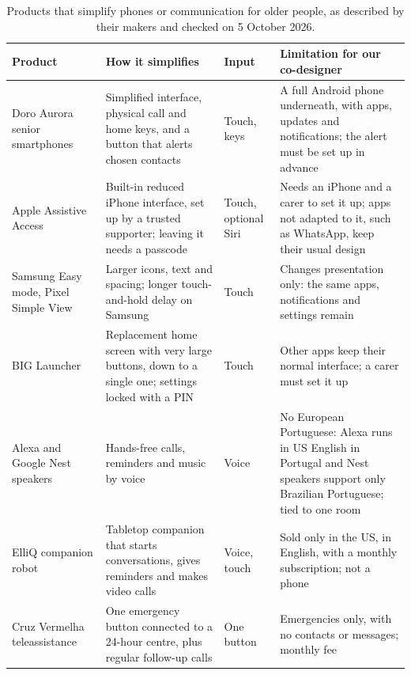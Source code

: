 \documentclass[acmtog,nonacm]{acmart}
\begin{document}
\begin{table}[t]
  \caption{Products that simplify phones or communication for older people, as described by their makers and checked on 5 October 2026.}
  \label{tab:products}
  \small
  \begin{tabular}{@{}L{0.17\textwidth}L{0.33\textwidth}L{0.1\textwidth}L{0.34\textwidth}@{}}
    \toprule
    Product & How it simplifies & Input & Limitation for our co-designer \\
    \midrule
    Doro Aurora senior smartphones~\cite{doro2026aurora} & Simplified interface, physical call and home keys, and a button that alerts chosen contacts & Touch, keys & A full Android phone underneath, with apps, updates and notifications; the alert must be set up in advance \\
    \addlinespace
    Apple Assistive Access~\cite{apple2023assistiveaccess, apple2026aaapps} & Built-in reduced iPhone interface, set up by a trusted supporter; leaving it needs a passcode & Touch, optional Siri & Needs an iPhone and a carer to set it up; apps not adapted to it, such as WhatsApp, keep their usual design \\
    \addlinespace
    Samsung Easy mode, Pixel Simple View~\cite{samsung2026easymode, google2024pixeldrop} & Larger icons, text and spacing; longer touch-and-hold delay on Samsung & Touch & Changes presentation only: the same apps, notifications and settings remain \\
    \addlinespace
    BIG Launcher~\cite{biglauncher2026} & Replacement home screen with very large buttons, down to a single one; settings locked with a PIN & Touch & Other apps keep their normal interface; a carer must set it up \\
    \addlinespace
    Alexa and Google Nest speakers~\cite{pplware2021alexa, amazon2026alexalanguages, google2026nestlanguages} & Hands-free calls, reminders and music by voice & Voice & No European Portuguese: Alexa runs in US English in Portugal and Nest speakers support only Brazilian Portuguese; tied to one room \\
    \addlinespace
    ElliQ companion robot~\cite{elliq2026membership} & Tabletop companion that starts conversations, gives reminders and makes video calls & Voice, touch & Sold only in the US, in English, with a monthly subscription; not a phone \\
    \addlinespace
    Cruz Vermelha teleassistance~\cite{cvp2026teleassistencia} & One emergency button connected to a 24-hour centre, plus regular follow-up calls & One button & Emergencies only, with no contacts or messages; monthly fee \\

\end{tabular}
\end{table}
\end{document}
